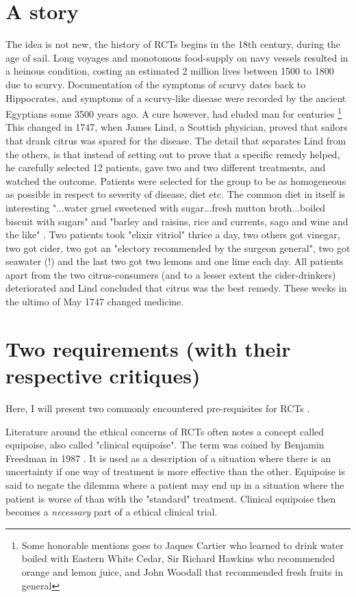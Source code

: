 \documentclass[12p]{article}
\begin{document}
\section*{A story}

The idea is not new, the history of RCTs begins in the 18th century, during the age of sail.
Long voyages and monotonous food-supply on navy vessels resulted in a heinous condition, costing an estimated 2 million lives between 1500 to 1800 due to scurvy.
Documentation of the symptoms of scurvy dates back to Hippocrates, and symptoms of a scurvy-like disease were recorded by the ancient Egyptians some 3500 years ago.
A cure however, had eluded man for centuries \footnote{Some honorable mentions goes to Jaques Cartier who learned to drink water boiled with Eastern White Cedar, Sir Richard Hawkins who recommended orange and lemon juice, and John Woodall that recommended fresh fruits in general}
This changed in 1747, when James Lind, a Scottish physician, proved that sailors that drank citrus was spared for the disease.
The detail that separates Lind from the others, is that instead of setting out to prove that a specific remedy helped, he carefully selected 12 patients, gave two and two different treatments, and watched the outcome.
Patients were selected for the group to be as homogeneous as possible in respect to severity of disease, diet etc.
The common diet in itself is interesting "...water gruel sweetened with sugar...fresh mutton broth...boiled biscuit with sugars" and "barley and raisins, rice and currents, sago and wine and the like" \cite{lind}.
Two patients took "elixir vitriol" thrice a day, two others got vinegar, two got cider, two got an "electory recommended by the surgeon general", two got seawater (!) and the last two got two lemons and one lime each day.
All patients apart from the two citrus-consumers (and to a lesser extent the cider-drinkers) deteriorated and Lind concluded that citrus was the best remedy.
These weeks in the ultimo of May 1747 changed medicine.

\section*{Two requirements (with their respective critiques)}

Here, I will present two commonly encountered pre-requisites for RCTs \cite{nadineth}.

Literature around the ethical concerns of RCTs often notes a concept called equipoise, also called "clinical equipoise".
The term was coined by Benjamin Freedman in 1987 \cite{freedmaneq}.
It is used as a description of a situation where there is an uncertainty if one way of treatment is more effective than the other.
Equipoise is said to negate the dilemma where a patient may end up in a situation where the patient is worse of than with the "standard" treatment.
Clinical equipoise then becomes a \emph{necessary} part of a ethical clinical trial.
\end{document}
